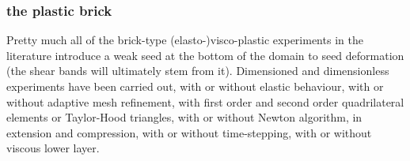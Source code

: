 \subsubsection{the plastic brick}

\Literature \cite{hans03,moml07,lemm08,kaus10,egat10,qurj09,mishin11,maie12,spmw16,gltf18,frbt19,aspectmanual}

Pretty much all of the brick-type (elasto-)visco-plastic experiments in the literature
introduce a weak seed at the bottom of the domain to seed deformation (the shear bands
will ultimately stem from it). 
Dimensioned and dimensionless experiments have been carried out, with or without 
elastic behaviour, with or without adaptive mesh refinement, with first order and 
second order quadrilateral elements or Taylor-Hood triangles, with or without 
Newton algorithm, in extension and compression, with or without time-stepping,
with or without viscous lower layer. 


